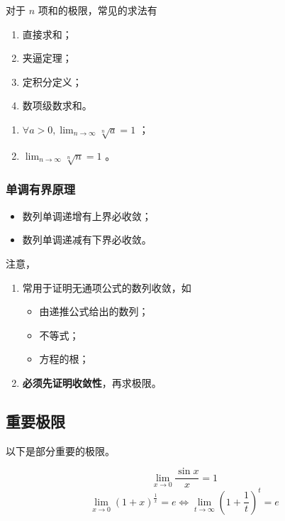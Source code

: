 对于 $ n $ 项和的极限，常见的求法有
\begin{enumerate}
    \item 直接求和；
    \item 夹逼定理；
    \item 定积分定义；
    \item 数项级数求和。
\end{enumerate}

\begin{Field}[两个常见的极限]

    \begin{enumerate}
        \item $ \forall a>0,\displaystyle\lim_{n\rightarrow\infty}\sqrt[n]{a}=1 $ ；
        \item $ \displaystyle\lim_{n\rightarrow\infty}\sqrt[n]{n}=1 $ 。
    \end{enumerate}
\end{Field}

\subsubsection{单调有界原理}

\begin{itemize}
    \item 数列单调递增有上界必收敛；
    \item 数列单调递减有下界必收敛。
\end{itemize}

注意，
\begin{enumerate}
    \item 常用于证明无通项公式的数列收敛，如
    \begin{itemize}
        \item 由递推公式给出的数列；
        \item 不等式；
        \item 方程的根；
    \end{itemize}
    \item \textbf{必须先证明收敛性}，再求极限。
\end{enumerate}

\subsection{重要极限}

以下是部分重要的极限。

$$
    \lim_{x\rightarrow0}\frac{\sin x}{x}=1
$$ 
$$
    \lim_{x\rightarrow0}(1+x)^{\frac 1x}=e\Leftrightarrow \lim_{t\rightarrow\infty}(1+\frac 1t)^t=e
$$ 

